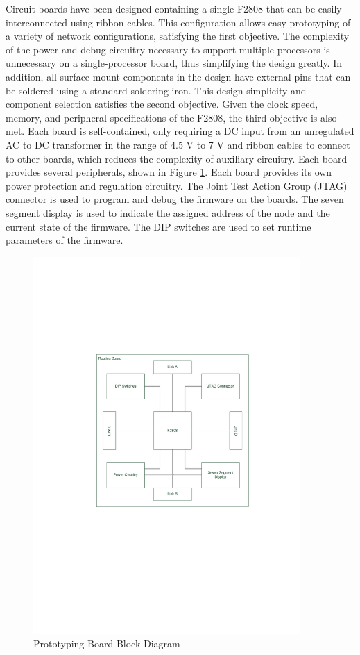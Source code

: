 Circuit boards have been designed containing a single F2808 that can be easily interconnected using ribbon cables. This configuration allows easy prototyping of a variety of network configurations, satisfying the first objective. The complexity of the power and debug circuitry necessary to support multiple processors is unnecessary on a single-processor board, thus simplifying the design greatly. In addition, all surface mount components in the design have external pins that can be soldered using a standard soldering iron. This design simplicity and component selection satisfies the second objective. Given the clock speed, memory, and peripheral specifications of the F2808, the third objective is also met. Each board is self-contained, only requiring a DC input from an unregulated AC to DC transformer in the range of 4.5 V to 7 V and ribbon cables to connect to other boards, which reduces the complexity of auxiliary circuitry.
Each board provides several peripherals, shown in Figure \ref{fig:hardware:block_diagram}. Each board provides its own power protection and regulation circuitry. The Joint Test Action Group (JTAG) connector is used to program and debug the firmware on the boards. The seven segment display is used to indicate the assigned address of the node and the current state of the firmware. The DIP switches are used to set runtime parameters of the firmware.

\begin{figure}[ptb]
	\begin{centering}
		\includegraphics[width=4in]{Hardware/Figures/hardware-block_diagram.pdf}
		\caption{Prototyping Board Block Diagram}
		\label{fig:hardware:block_diagram}
	\end{centering}
\end{figure}

